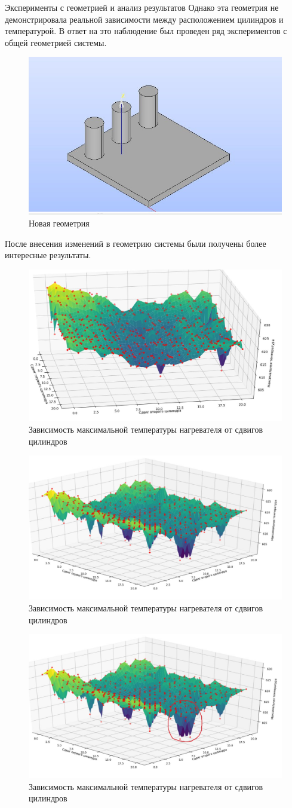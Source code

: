 \documentclass{beamer}
\begin{document}
\begin{frame}{Эксперименты с геометрией и анализ результатов}
	Однако эта геометрия не демонстрировала реальной зависимости между расположением цилиндров и температурой. В ответ на это наблюдение был проведен ряд экспериментов с общей геометрией системы.

	\begin{figure}[h]
		\centering
		\includegraphics[width=0.4\linewidth]{20.jpg}
		\caption{Новая геометрия}
	\end{figure}

	После внесения изменений в геометрию системы были получены более интересные результаты.

	\begin{figure}[h]
		\centering
		\includegraphics[width=0.4\linewidth]{21.1.jpg}
		\caption{Зависимость максимальной температуры нагревателя от сдвигов цилиндров}
	\end{figure}
	\begin{figure}[h]
		\centering
		\includegraphics[width=0.4\linewidth]{21.2.jpg}
		\caption{Зависимость максимальной температуры нагревателя от сдвигов цилиндров}
	\end{figure}
	\begin{figure}[h]
		\centering
		\includegraphics[width=0.4\linewidth]{21.3.jpg}
		\caption{Зависимость максимальной температуры нагревателя от сдвигов цилиндров}
	\end{figure}


\end{frame}
\end{document}
